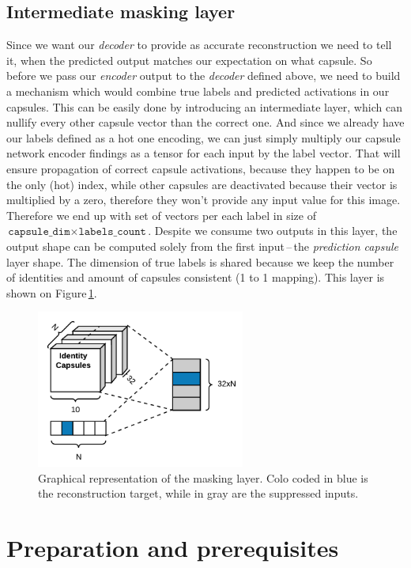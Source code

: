 \subsection{Intermediate masking layer}

Since we want our \textit{decoder} to provide as accurate reconstruction we need to tell it, when the predicted output matches our expectation on what capsule. So before we pass our \textit{encoder} output to the \textit{decoder} defined above, we need to build a mechanism which would combine true labels and predicted activations in our capsules. This can be easily done by introducing an intermediate layer, which can nullify every other capsule vector than the correct one. And since we already have our labels defined as a hot one encoding, we can just simply multiply our capsule network encoder findings as a tensor for each input by the label vector. That will ensure propagation of correct capsule activations, because they happen to be on the only (hot) index, while other capsules are deactivated because their vector is multiplied by a zero, therefore they won't provide any input value for this image. Therefore we end up with set of vectors per each label in size of $\texttt{capsule\_dim}\times\texttt{labels\_count}$. Despite we consume two outputs in this layer, the output shape can be computed solely from the first input\,--\,the \textit{prediction capsule} layer shape. The dimension of true labels is shared because we keep the number of identities and amount of capsules consistent (1 to 1 mapping). This layer is shown on Figure\,\ref{fig:mask}.

\begin{figure}[ht]
    \centering
    \includegraphics[height=14em]{obrazky-figures/my_mask.pdf}
    \caption{Graphical representation of the masking layer. Colo coded in blue is the reconstruction target, while in gray are the suppressed inputs.}
    \label{fig:mask}
\end{figure}

\section{Preparation and prerequisites}

